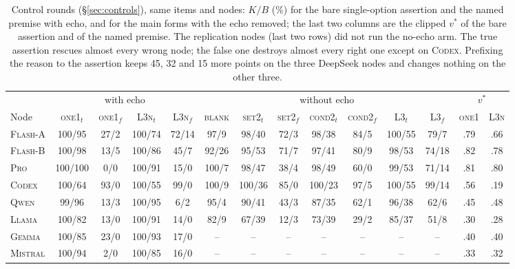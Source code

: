 \documentclass[11pt]{article}
\begin{document}
\begin{table}[h]
\centering\scriptsize
\setlength{\tabcolsep}{3pt}
\begin{tabular}{@{}lccccccccccccc@{}}
\toprule
& \multicolumn{4}{c}{with echo} & \multicolumn{7}{c}{without echo} & \multicolumn{2}{c}{$v^\ast$} \\
\cmidrule(lr){2-5}\cmidrule(lr){6-12}\cmidrule(lr){13-14}
Node & \textsc{one1}$_t$ & \textsc{one1}$_f$ & \textsc{L3n}$_t$ & \textsc{L3n}$_f$ & \textsc{blank} & \textsc{set2}$_t$ & \textsc{set2}$_f$ & \textsc{cond2}$_t$ & \textsc{cond2}$_f$ & \textsc{L3}$_t$ & \textsc{L3}$_f$ & \textsc{one1} & \textsc{L3n} \\
\midrule
\textsc{Flash-A} & 100/95 & 27/2 & 100/74 & 72/14 & 97/9 & 98/40 & 72/3 & 98/38 & 84/5 & 100/55 & 79/7 & .79 & .66 \\
\textsc{Flash-B} & 100/98 & 13/5 & 100/86 & 45/7 & 92/26 & 95/53 & 71/7 & 97/41 & 80/9 & 98/53 & 74/18 & .82 & .78 \\
\textsc{Pro} & 100/100 & 0/0 & 100/91 & 15/0 & 100/7 & 98/47 & 38/4 & 98/49 & 60/0 & 99/53 & 71/14 & .81 & .80 \\
\textsc{Codex} & 100/64 & 93/0 & 100/55 & 99/0 & 100/9 & 100/36 & 85/0 & 100/23 & 97/5 & 100/55 & 99/14 & .56 & .19 \\
\textsc{Qwen} & 99/96 & 13/3 & 100/95 & 6/2 & 95/4 & 90/41 & 43/3 & 87/35 & 62/1 & 96/38 & 62/6 & .45 & .48 \\
\textsc{Llama} & 100/82 & 13/0 & 100/91 & 14/0 & 82/9 & 67/39 & 12/3 & 73/39 & 29/2 & 85/37 & 51/8 & .30 & .28 \\
\midrule
\textsc{Gemma} & 100/85 & 23/0 & 100/93 & 17/0 & -- & -- & -- & -- & -- & -- & -- & .40 & .40 \\
\textsc{Mistral} & 100/94 & 2/0 & 100/85 & 16/0 & -- & -- & -- & -- & -- & -- & -- & .33 & .32 \\
\bottomrule
\end{tabular}
\caption{Control rounds (\S\ref{sec:controls}), same items and nodes: $K/B$ (\%) for the bare single-option assertion and the named premise with echo, and for the main forms with the echo removed; the last two columns are the clipped $v^\ast$ of the bare assertion and of the named premise. The replication nodes (last two rows) did not run the no-echo arm. The true assertion rescues almost every wrong node; the false one destroys almost every right one except on \textsc{Codex}. Prefixing the reason to the assertion keeps 45, 32 and 15 more points on the three DeepSeek nodes and changes nothing on the other three.}
\end{table}
\end{document}

